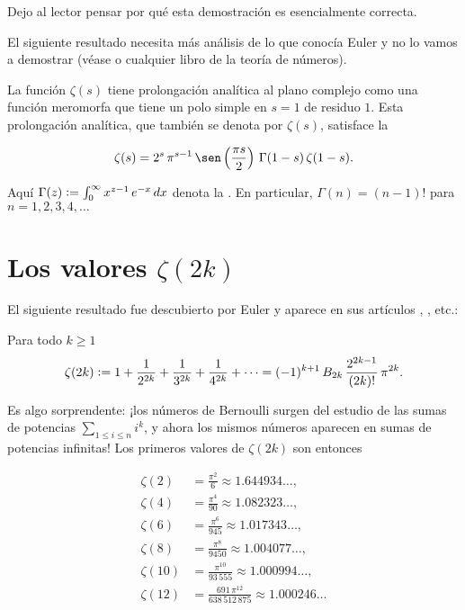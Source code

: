 \documentclass{article}
\numberwithin{equation}{section}
\theoremstyle{definition}
\begin{document}
Dejo al lector pensar por qué esta demostración es esencialmente correcta.

El siguiente resultado necesita más análisis de lo que conocía Euler y no
lo vamos a demostrar (véase \cite[Chapter 5, \S 4]{Ahlfors-1978} o cualquier
libro de la teoría de números).

\begin{hecho}
  La función $\zeta (s)$ tiene prolongación analítica al plano complejo como una
  función meromorfa que tiene un polo simple en $s = 1$ de residuo $1$. Esta
  prolongación analítica, que también se denota por $\zeta (s)$, satisface
  la 

  \begin{equation}
    \label{ecuacion-funcional}
    \zeta (s) = 2^s \, \pi^{s-1} \, \sen \left(\frac{\pi s}{2}\right)\,\Gamma (1-s)\,\zeta (1-s).
  \end{equation}
\end{hecho}

Aquí $\Gamma (z) \mathrel{\mathop:}= \int_0^\infty x^{z-1}\,e^{-x}\,dx$ denota la
. En particular, $\Gamma (n) = (n-1)!$ para
$n = 1,2,3,4,\ldots$


\section{Los valores $\zeta (2k)$}
\label{section:valores-de-zeta2k}

El siguiente resultado fue descubierto por Euler y aparece en sus artículos
\cite{E41}, \cite{E352}, etc.:

\begin{teorema}
  \label{thm:valores-de-zeta-2k}
  Para todo $k\ge 1$
  $$\zeta (2k) \mathrel{\mathop:}= 1 + \frac{1}{2^{2k}} + \frac{1}{3^{2k}} + \frac{1}{4^{2k}} + \cdots =
  (-1)^{k+1} \, B_{2k}\,\frac{2^{2k-1}}{(2k)!}\,\pi^{2k}.$$
\end{teorema}

Es algo sorprendente: ¡los números de Bernoulli surgen del estudio de las sumas
de potencias $\sum_{1 \le i \le n} i^k$, y ahora los mismos números aparecen en
sumas de potencias infinitas! Los primeros valores de $\zeta (2k)$ son entonces

\begin{align*}
  \zeta (2) & = \frac{\pi^2}{6} \approx 1.644934\ldots, \\
  \zeta (4) & = \frac{\pi^4}{90} \approx 1.082323\ldots, \\
  \zeta (6) & = \frac{\pi^6}{945}  \approx 1.017343\ldots, \\
  \zeta (8) & = \frac{\pi^8}{9450} \approx 1.004077\ldots, \\
  \zeta (10) & = \frac{\pi^{10}}{93\,555} \approx 1.000994\ldots, \\
  \zeta (12) & = \frac{691\,\pi^{12}}{638\,512\,875} \approx 1.000246\ldots
\end{align*}
\end{document}
